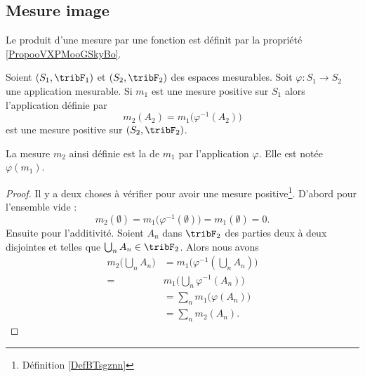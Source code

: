 \subsection{Mesure image}

Le produit d'une mesure par une fonction est définit par la propriété \ref{PropooVXPMooGSkyBo}.

\begin{propositionDef}     \label{PropJCJQooAdqrGA}
    Soient \( (S_1,\tribF_1)\) et \( (S_2,\tribF_2)\) des espaces mesurables. Soit \( \varphi\colon S_1\to S_2\) une application mesurable. Si \( m_1\) est une mesure positive sur \( S_1\) alors l'application définie par
    \begin{equation}
        m_2(A_2)=m_1\big( \varphi^{-1}(A_2) \big)
    \end{equation}
    est une mesure positive sur \( (S_2,\tribF_2)\).

    La mesure \( m_2\) ainsi définie est la  de \( m_1\) par l'application \( \varphi\). Elle est notée \( \varphi(m_1)\).
\end{propositionDef}

\begin{proof}
    Il y a deux choses à vérifier pour avoir une mesure positive\footnote{Définition \ref{DefBTsgznn}}. D'abord pour l'ensemble vide :
    \begin{equation}
        m_2(\emptyset)=m_1\big( \varphi^{-1}(\emptyset) \big)=m_1(\emptyset)=0.
    \end{equation}
    Ensuite pour l'additivité. Soient \( A_n\) dans \( \tribF_2\) des parties deux à deux disjointes et telles que \( \bigcup_nA_n\in\tribF_2\). Alors nous avons
    \begin{subequations}
        \begin{align}
            m_2\big( \bigcup_nA_n \big)&=m_1\Big( \varphi^{-1}(\bigcup_nA_n) \Big)\\
            =&m_1\big( \bigcup_n\varphi^{-1}(A_n) \big)\\
            &=\sum_nm_1\big( \varphi(A_n) \big)\\
            &=\sum_nm_2(A_n).
        \end{align}
    \end{subequations}
\end{proof}

